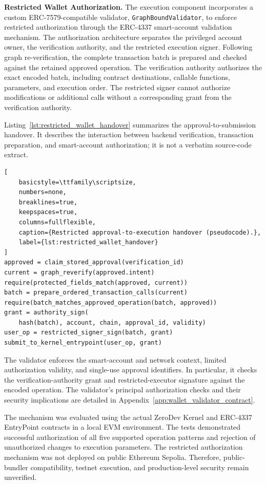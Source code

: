 \medskip
\noindent\textbf{Restricted Wallet Authorization.}
The execution component incorporates a custom
ERC-7579-compatible validator, \texttt{GraphBoundValidator},
to enforce restricted authorization through the
ERC-4337 smart-account validation mechanism. The authorization
architecture separates the privileged account owner, the
verification authority, and the restricted execution signer.
Following graph re-verification, the complete transaction
batch is prepared and checked against the retained approved
operation. The verification authority authorizes the exact
encoded batch, including contract destinations, callable
functions, parameters, and execution order. The restricted
signer cannot authorize modifications or additional calls
without a corresponding grant from the verification authority.

Listing~\ref{lst:restricted_wallet_handover} summarizes the
approval-to-submission handover. It describes the interaction
between backend verification, transaction preparation, and
smart-account authorization; it is not a verbatim source-code
extract.

\begin{lstlisting}[
    basicstyle=\ttfamily\scriptsize,
    numbers=none,
    breaklines=true,
    keepspaces=true,
    columns=fullflexible,
    caption={Restricted approval-to-execution handover (pseudocode).},
    label={lst:restricted_wallet_handover}
]
approved = claim_stored_approval(verification_id)
current = graph_reverify(approved.intent)
require(protected_fields_match(approved, current))
batch = prepare_ordered_transaction_calls(current)
require(batch_matches_approved_operation(batch, approved))
grant = authority_sign(
    hash(batch), account, chain, approval_id, validity)
user_op = restricted_signer_sign(batch, grant)
submit_to_kernel_entrypoint(user_op, grant)
\end{lstlisting}

The validator enforces the smart-account and network context,
limited authorization validity, and single-use approval
identifiers. In particular, it checks the verification-authority
grant and restricted-executor signature against the encoded
operation. The validator's principal authorization checks and
their security implications are detailed in
Appendix~\ref{app:wallet_validator_contract}.

The mechanism was evaluated using the actual ZeroDev Kernel
and ERC-4337 EntryPoint contracts in a local EVM environment.
The tests demonstrated successful authorization of all five
supported operation patterns and rejection of unauthorized
changes to execution parameters. The restricted authorization
mechanism was not deployed on public Ethereum Sepolia.
Therefore, public-bundler compatibility, testnet execution,
and production-level security remain unverified.


